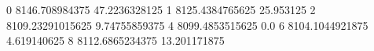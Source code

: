 0 8146.708984375 47.2236328125
1 8125.4384765625 25.953125
2 8109.23291015625 9.74755859375
4 8099.4853515625 0.0
6 8104.1044921875 4.619140625
8 8112.6865234375 13.201171875
